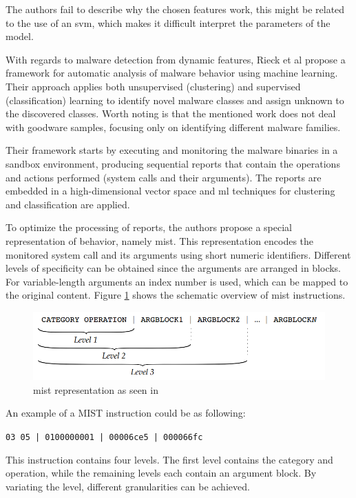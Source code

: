 \documentclass{llncs}
\begin{document}
The authors fail to describe why the chosen features work, this might be related to the use of an \gls{svm}, which makes it difficult interpret the parameters of the model.

With regards to malware detection from dynamic features, Rieck et al\cite{rieck:dynamic} propose a framework for automatic analysis of malware behavior using machine learning. Their approach applies both unsupervised (clustering) and supervised (classification) learning to identify novel malware classes and assign unknown to the discovered classes. Worth noting is that the mentioned work does not deal with goodware samples, focusing only on identifying different malware families.

Their framework starts by executing and monitoring the malware binaries in a sandbox environment, producing sequential reports that contain the operations and actions performed (system calls and their arguments). The reports are embedded in a high-dimensional vector space and \gls{ml} techniques for clustering and classification are applied.

To optimize the processing of reports, the authors propose a special representation of behavior, namely \gls{mist}. This representation encodes the monitored system call and its arguments using short numeric identifiers. Different levels of specificity can be obtained since the arguments are arranged in blocks. For variable-length arguments an index number is used, which can be mapped to the original content. Figure \ref{fig:mist} shows the schematic overview of \gls{mist} instructions.

\begin{figure}[h]
	\includegraphics[width=\textwidth]{mist}
	\caption{\gls{mist} representation as seen in \cite{rieck:dynamic}}
	\label{fig:mist}
\end{figure}

An example of a MIST instruction could be as following:

\begin{center}\texttt{03 05 | 0100000001 | 00006ce5 | 000066fc}\end{center}

This instruction contains four levels. The first level contains the category and operation, while the remaining levels each contain an argument block. By variating the level, different granularities can be achieved.
\end{document}
